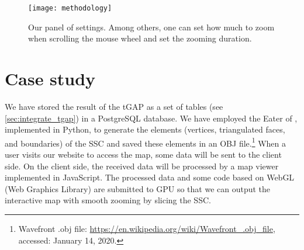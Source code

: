 \documentclass[twocolumn]{svjour3}          %
\begin{document}
\begin{figure*}[tb]
\centering
\texttt{[image: methodology]}
\caption{Our panel of settings. 
Among others, one can set how much to zoom when scrolling the mouse wheel 
and set the zooming duration. 
}
\label{fig:interaction_settings}
\end{figure*}


\section{Case study}
\label{sec:case_study}




We have stored the result of the tGAP 
as a set of tables (see \sect\ref{sec:integrate_tgap}) 
in a PostgreSQL database.
We have employed the Eater of \citet{Suba2014Merge},
implemented in Python, 
to generate the elements
(vertices, triangulated faces, and boundaries)
of the SSC \citep{vanOosterom2014tGAPSSC} 
and saved these elements in an OBJ file.\footnote{%
Wavefront .obj file:
\url{https://en.wikipedia.org/wiki/Wavefront_.obj_file},
accessed: January 14, 2020.}
%
When a user visits our website to access the map,
some data will be sent to the client side.  
On the client side,
the received data will be processed
by a map viewer implemented in JavaScript.
The processed data and some code based on WebGL (Web Graphics Library)
are submitted to GPU so that we can output the interactive map with smooth zooming
by slicing the SSC.
\end{document}
